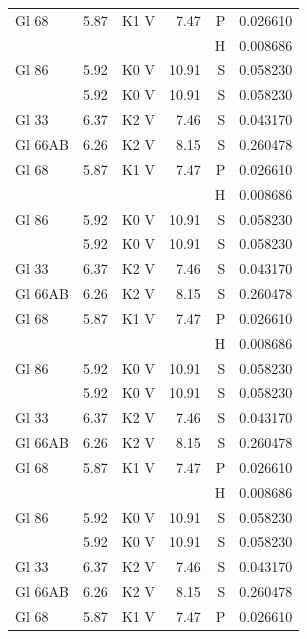\documentclass{aa}
\begin{document}
{\begin{longtable}{lllrrr}
		Gl 68     & 5.87    & K1 V     & 7.47     & P    & 0.026610   \\
		          &         &          &          & H    & 0.008686   \\
		Gl 86     & 5.92    & K0 V     & 10.91    & S    & 0.058230   \\            & 5.92 & K0 V & 10.91& S & 0.058230\\
		Gl 33     & 6.37    & K2 V     & 7.46     & S    & 0.043170   \\
		Gl 66AB   & 6.26    & K2 V     & 8.15     & S    & 0.260478   \\
		Gl 68     & 5.87    & K1 V     & 7.47     & P    & 0.026610   \\
		          &         &          &          & H    & 0.008686   \\
		Gl 86     & 5.92    & K0 V     & 10.91    & S    & 0.058230   \\            & 5.92 & K0 V & 10.91& S & 0.058230\\
		Gl 33     & 6.37    & K2 V     & 7.46     & S    & 0.043170   \\
		Gl 66AB   & 6.26    & K2 V     & 8.15     & S    & 0.260478   \\
		Gl 68     & 5.87    & K1 V     & 7.47     & P    & 0.026610   \\
		          &         &          &          & H    & 0.008686   \\
		Gl 86     & 5.92    & K0 V     & 10.91    & S    & 0.058230   \\            & 5.92 & K0 V & 10.91& S & 0.058230\\
		Gl 33     & 6.37    & K2 V     & 7.46     & S    & 0.043170   \\
		Gl 66AB   & 6.26    & K2 V     & 8.15     & S    & 0.260478   \\
		Gl 68     & 5.87    & K1 V     & 7.47     & P    & 0.026610   \\
		          &         &          &          & H    & 0.008686   \\
		Gl 86     & 5.92    & K0 V     & 10.91    & S    & 0.058230   \\            & 5.92 & K0 V & 10.91& S & 0.058230\\
		Gl 33     & 6.37    & K2 V     & 7.46     & S    & 0.043170   \\
		Gl 66AB   & 6.26    & K2 V     & 8.15     & S    & 0.260478   \\
		Gl 68     & 5.87    & K1 V     & 7.47     & P    & 0.026610   \\

\end{longtable}}
\end{document}
